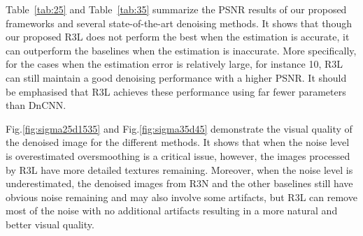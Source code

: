 \documentclass{article}
\begin{document}
\begin{table}[htbp]
\caption{The average PSNR (dB) results of different methods. All the methods are set/trained with . The best and the second best results are highlighted in \textcolor{red}{red} and \textcolor{blue}{blue} respectively. } \label{tab:25} 
\centering
{}
\end{table}
Table~\ref{tab:25} and Table~\ref{tab:35} summarize the PSNR results of our proposed frameworks and several
state-of-the-art denoising methods. It shows that though our proposed R3L does not perform the best when the estimation is accurate, it can outperform the baselines when the estimation is inaccurate. More specifically, for the cases when the estimation error is relatively large, for instance  10, R3L can still maintain a good denoising performance with a higher PSNR. It should be emphasised that R3L achieves these performance using far fewer parameters than DnCNN.\par Fig.\ref{fig:sigma25d1535} and Fig.\ref{fig:sigma35d45} demonstrate the visual quality of the denoised image for the different methods.
It shows that when the noise level is overestimated oversmoothing is a critical issue, however, the images processed by R3L have more detailed textures remaining. Moreover, when the noise level is underestimated, the denoised images from R3N and the other baselines still have obvious noise remaining and may also involve some artifacts, but R3L can remove most of the noise with no additional artifacts resulting in a more natural and better visual quality. 
\end{document}
